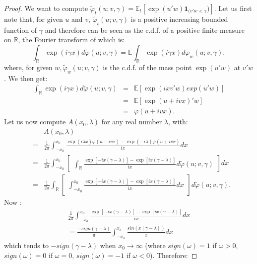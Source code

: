\documentclass[
  12pt,
]{book}
\theoremstyle{definition}
\theoremstyle{definition}
\theoremstyle{definition}
\theoremstyle{definition}
\theoremstyle{remark}
\begin{document}
\begin{proof}
We want to compute \(\tilde{\varphi}_t(u;v,\gamma) = \mathbb{E}_t[\exp(u'w)\textbf{1}_{(v'w<\gamma})]\). Let us first note that, for given \(u\) and \(v\), \(\tilde{\varphi}_t(u;v,\gamma)\) is a positive increasing bounded function of \(\gamma\) and therefore can be seen as the c.d.f. of a positive finite measure on \(\mathbb{R}\), the Fourier transform of which is:
\[
\int_{\mathbb{R}} \exp(i\gamma x)d\tilde{\varphi}(u;v,\gamma) = \mathbb{E} \int_{\mathbb{R}} \exp(i\gamma x)d\tilde{\varphi}_w(u;v,\gamma),
\]
where, for given \(w, \tilde{\varphi}_w(u;v,\gamma)\) is the c.d.f. of the mass point \(\exp(u'w)\) at \(v'w\). We then get:
\begin{eqnarray*}
\int_{\mathbb{R}} \exp(i\gamma x) d\tilde{\varphi}(u;v,\gamma) &=& \mathbb{E}[\exp(ixv'w)exp(u'w)] \\
& =& \mathbb{E}[\exp(u+ivx)'w] \\
& =& \varphi(u+ivx).
\end{eqnarray*}
Let us now compute \(A(x_0,\lambda)\) for any real number \(\lambda\), with:
\begin{eqnarray*}
&&A(x_0,\lambda) \\
&=&  \frac{1}{2\pi} \int^{x_0}_{-x_0}
\frac{\exp(i\lambda x)\varphi(u-ivx)-\exp(-i\lambda)\varphi(u+ivx)}{ix}dx \\
&=&  \frac{1}{2\pi} \int^{x_0}_{-x_0}\left[ \begin{array}{l}  \int_{\mathbb{R}}
\frac{\exp[-ix(\gamma-\lambda)]-\exp[ix(\gamma-\lambda)]}{ix}d\tilde{\varphi}(u;v,\gamma)
\end{array} \right]dx \\
&=&  \frac{1}{2\pi}  \int_{\mathbb{R}}
\left[ \begin{array}{l}   \int^{x_0}_{-x_0}   \frac{\exp[-ix(\gamma-\lambda)]
-\exp[ix(\gamma-\lambda)]}{ix}dx \end{array} \right]d\tilde{\varphi}(u;v,\gamma).
\end{eqnarray*}
Now :
\begin{eqnarray*}
\frac{1}{2\pi} \int^{x_o}_{-x_o}
\frac{\exp[-ix(\gamma-\lambda)]
-\exp[ix(\gamma-\lambda)]}{ix}dx \\ =  \frac{-sign(\gamma-\lambda)}{\pi}
\int^{x_o}_{-x_o} \frac{sin(x\mid\gamma-\lambda\mid)}{x}dx
\end{eqnarray*}
which tends to \(-sign(\gamma-\lambda)\) when \(x_0\rightarrow\infty\) (where \(sign(\omega)=1\) if \(\omega>0\), \(sign(\omega)=0\) if \(\omega=0\), \(sign(\omega)=-1\) if \(\omega<0\)).
Therefore:

\end{proof}
\end{document}
